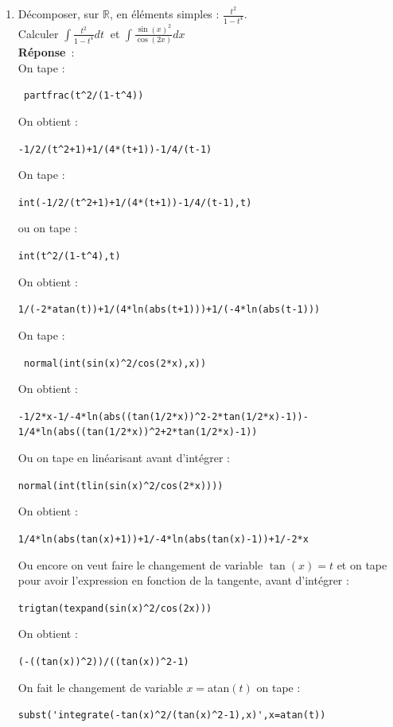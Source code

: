 \documentclass{article}
\begin{document}
\begin{enumerate}
\item D\'ecomposer, sur $\mathbb R$, en \'el\'ements simples :
$\displaystyle \frac{t^2}{1-t^4}$.\\
Calculer $\displaystyle \int \frac{t^2}{1-t^4}dt\ $ et $\displaystyle\int \frac{\sin(x)^2}{\cos(2x)}dx$\\
{\bf R\'eponse}~:\\
On tape :
\begin{center}
\verb| partfrac(t^2/(1-t^4))|
\end{center}
On obtient :
\begin{center}
\verb|-1/2/(t^2+1)+1/(4*(t+1))-1/4/(t-1)|
\end{center}
On tape :
\begin{center}
\verb|int(-1/2/(t^2+1)+1/(4*(t+1))-1/4/(t-1),t)|
\end{center}
ou on tape :
\begin{center}
\verb|int(t^2/(1-t^4),t)|
\end{center}
On obtient :
\begin{center}
\verb|1/(-2*atan(t))+1/(4*ln(abs(t+1)))+1/(-4*ln(abs(t-1)))|
\end{center}
On tape :
\begin{center}
\verb| normal(int(sin(x)^2/cos(2*x),x))|
\end{center}
On obtient :
\begin{center}
\verb|-1/2*x-1/-4*ln(abs((tan(1/2*x))^2-2*tan(1/2*x)-1))-|
\verb|1/4*ln(abs((tan(1/2*x))^2+2*tan(1/2*x)-1))|
\end{center}
Ou on tape en lin\'earisant avant d'int\'egrer :
\begin{center}
\verb|normal(int(tlin(sin(x)^2/cos(2*x))))|
\end{center}
On obtient :
\begin{center}
\verb|1/4*ln(abs(tan(x)+1))+1/-4*ln(abs(tan(x)-1))+1/-2*x|
\end{center}
Ou encore on veut faire le changement de variable $\tan(x)=t$
et on tape pour avoir l'expression en fonction de la tangente,
 avant d'int\'egrer :
\begin{center}
\verb|trigtan(texpand(sin(x)^2/cos(2x)))|
\end{center}
On obtient :
\begin{center}
\verb|(-((tan(x))^2))/((tan(x))^2-1)|
\end{center}
On fait le changement de variable $x=$atan$(t)$  on tape  :
\begin{center}
\verb|subst('integrate(-tan(x)^2/(tan(x)^2-1),x)',x=atan(t))|
\end{center}

\end{enumerate}
\end{document}
